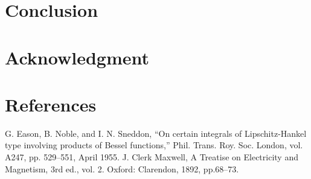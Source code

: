 \documentclass[conference]{IEEEtran}
\begin{document}
\section{Conclusion}


\section*{Acknowledgment}

\section*{References}


\begin{thebibliography}{00}
 G. Eason, B. Noble, and I. N. Sneddon, ``On certain integrals of Lipschitz-Hankel type involving products of Bessel functions,'' Phil. Trans. Roy. Soc. London, vol. A247, pp. 529--551, April 1955.
 J. Clerk Maxwell, A Treatise on Electricity and Magnetism, 3rd ed., vol. 2. Oxford: Clarendon, 1892, pp.68--73.
\end{thebibliography}
\end{document}
